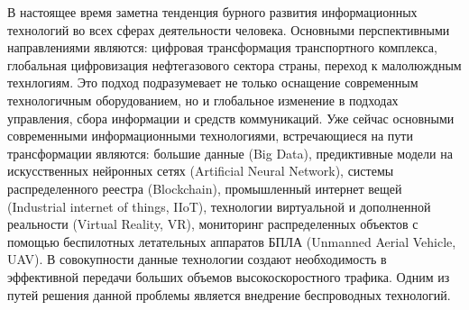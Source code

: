 {\actuality} 

В настоящее время заметна тенденция бурного развития информационных технологий во всех сферах деятельности человека. Основными перспективными направлениями являются: цифровая трансформация транспортного комплекса, глобальная цифровизация нефтегазового сектора страны, переход к малолюждным технлогиям. Это подход подразумевает не только оснащение современным технологичным оборудованием, но и глобальное изменение в подходах управления, сбора информации и средств коммуникаций. Уже сейчас основными современными информационными технологиями, встречающиеся на пути трансформации являются: большие данные (Big Data), предиктивные модели на искусственных нейронных сетях (Artificial Neural Network), системы распределенного реестра (Blockchain), промышленный интернет вещей (Industrial internet of things, IIoT), технологии виртуальной и дополненной реальности (Virtual Reality, VR), мониторинг распределенных объектов с помощью беспилотных летательных аппаратов БПЛА (Unmanned Aerial Vehicle, UAV). В совокупности данные технологии создают необходимость в эффективной передачи больших объемов высокоскоростного трафика. Одним из путей решения данной проблемы является внедрение беспроводных технологий.


 
